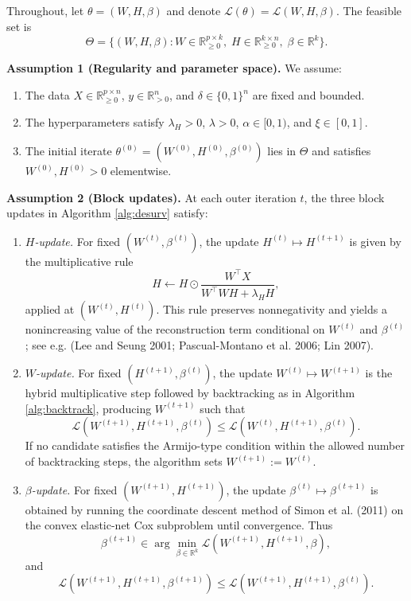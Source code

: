\documentclass[
]{article}
\begin{document}
Throughout, let \(\theta = (W,H,\beta)\) and denote
\(\mathcal{L}(\theta) = \mathcal{L}(W,H,\beta)\). The feasible set is \[
\Theta = \{(W,H,\beta):
  W \in \mathbb{R}_{\ge 0}^{p\times k},\;
  H \in \mathbb{R}_{\ge 0}^{k\times n},\;
  \beta \in \mathbb{R}^k\}.
\]

\textbf{Assumption 1 (Regularity and parameter space).} We assume:

\begin{enumerate}[label=(\roman*)]
  \item The data $X \in \mathbb{R}_{\ge 0}^{p\times n}$, $y \in \mathbb{R}^n_{>0}$, and $\delta \in \{0,1\}^n$ are fixed and bounded.
  \item The hyperparameters satisfy $\lambda_H > 0$, $\lambda>0$, $\alpha \in [0,1)$, and $\xi \in [0,1]$.
  \item The initial iterate $\theta^{(0)} = (W^{(0)},H^{(0)},\beta^{(0)})$ lies in $\Theta$ and satisfies $W^{(0)},H^{(0)} > 0$ elementwise.
\end{enumerate}

\textbf{Assumption 2 (Block updates).} At each outer iteration \(t\),
the three block updates in Algorithm \ref{alg:desurv} satisfy:

\begin{enumerate}[label=(\roman*)]
  \item \emph{$H$-update.} For fixed $(W^{(t)},\beta^{(t)})$, the update
        $H^{(t)} \mapsto H^{(t+1)}$ is given by the multiplicative rule
        \[
        H \leftarrow H \odot \frac{W^\top X}{W^\top W H + \lambda_H H},
        \]
        applied at $(W^{(t)},H^{(t)})$. This rule preserves nonnegativity and
        yields a nonincreasing value of the reconstruction term conditional on
        $W^{(t)}$ and $\beta^{(t)}$; see e.g.
        (Lee and Seung 2001; Pascual-Montano et al. 2006; Lin 2007).
  \item \emph{$W$-update.} For fixed $(H^{(t+1)},\beta^{(t)})$, the update
        $W^{(t)} \mapsto W^{(t+1)}$ is the hybrid multiplicative step
        followed by backtracking as in Algorithm \ref{alg:backtrack}, producing
        $W^{(t+1)}$ such that
        \[
          \mathcal{L}(W^{(t+1)},H^{(t+1)},\beta^{(t)})
          \le
          \mathcal{L}(W^{(t)},H^{(t+1)},\beta^{(t)}).
        \]
        If no candidate satisfies the Armijo-type condition within the allowed
        number of backtracking steps, the algorithm sets
        $W^{(t+1)} := W^{(t)}$.
  \item \emph{$\beta$-update.} For fixed $(W^{(t+1)},H^{(t+1)})$, the update
        $\beta^{(t)} \mapsto \beta^{(t+1)}$ is obtained by running the
        coordinate descent method of Simon et al. (2011) on the convex elastic-net Cox
        subproblem until convergence. Thus
        \[
          \beta^{(t+1)} \in
          \arg\min_{\beta\in\mathbb{R}^k}
          \mathcal{L}(W^{(t+1)},H^{(t+1)},\beta),
        \]
        and
        \[
          \mathcal{L}(W^{(t+1)},H^{(t+1)},\beta^{(t+1)})
          \le
          \mathcal{L}(W^{(t+1)},H^{(t+1)},\beta^{(t)}).
        \]
\end{enumerate}
\end{document}
